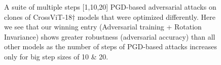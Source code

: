 \documentclass{article} %
\newcommand{\arturo}{\textcolor{violet}}
\begin{document}
\begin{figure}[!t]
\centering
{}\hfill
{}\hfill
{}\par 
\caption{A suite of multiple steps [1,10,20] PGD-based adversarial attacks on clones of CrossViT-18$\dagger$ models that were optimized differently. Here we see that our winning entry (Adversarial training + Rotation Invariance) shows greater robustness (adversarial accuracy) than all other models as the number of steps of PGD-based attacks increases only for big step sizes of 10 \& 20.}
\label{fig:AdvEffects}
\end{figure}





\end{document}
